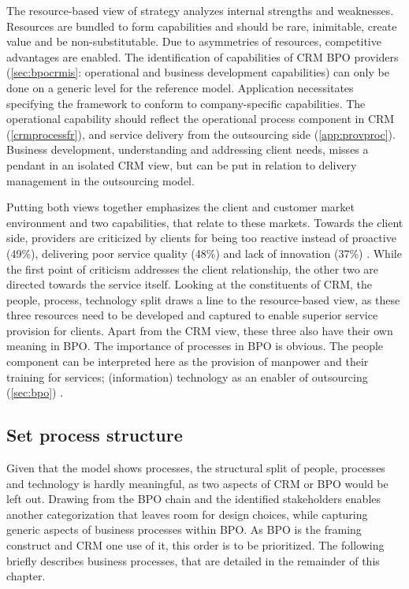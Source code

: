 	The resource-based view of strategy analyzes internal strengths and weaknesses. Resources are bundled to form capabilities and should be rare, inimitable, create value and be non-substitutable. Due to asymmetries of resources, competitive advantages are enabled. The identification of capabilities of CRM BPO providers (\cf \ref{sec:bpocrmis}: operational and business development capabilities) can only be done on a generic level for the reference model. Application necessitates specifying the framework to conform to company-specific capabilities. The operational capability should reflect the operational process component in CRM (\cf \ref{crmprocessfr}), and service delivery from the outsourcing side (\cf \ref{app:provproc}). Business development, \ie understanding and addressing client needs, misses a pendant in an isolated CRM view, but can be put in relation to delivery management in the outsourcing model. 
	
	Putting both views together emphasizes the client and customer market environment and two capabilities, that relate to these markets. Towards the client side, providers are criticized by clients for being too reactive instead of proactive (49\%), delivering poor service quality (48\%) and lack of innovation (37\%) \citep{deloitte2014outsourcing}. While the first point of criticism addresses the client relationship, the other two are directed towards the service itself. Looking at the constituents of \acrshort{CRM}, the people, process, technology split draws a line to the resource-based view, as these three resources need to be developed and captured to enable superior service provision for clients. Apart from the  \acrshort{CRM} view, these three also have their own meaning in \acrshort{BPO}. The importance of processes in  \acrshort{BPO} is obvious. The people component can be interpreted here as the provision of manpower and their training for services; (information) technology as an enabler of outsourcing (\cf \ref{sec:bpo}) . 
	
		
	\subsection{Set process structure}
	\label{sec:procstr}
	Given that the model shows processes, the structural split of people, processes and technology is hardly meaningful, as two aspects of  \acrshort{CRM} or \acrshort{BPO} would be left out. Drawing from the BPO chain and the identified stakeholders enables another categorization that leaves room for design choices, while capturing generic aspects of business processes within \acrshort{BPO}. As \acrshort{BPO} is the framing construct and  \acrshort{CRM} one use of it, this order is to be prioritized. The following briefly describes business processes, that are detailed in the remainder of this chapter.
	
